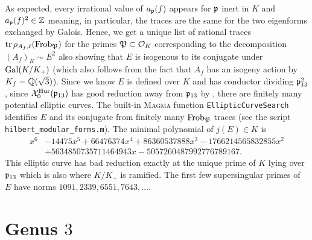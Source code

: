 \documentclass[main.tex]{subfiles}
\begin{document}
As expected, every irrational value of $a_{\mathfrak{p}}(f)$ appears for $\mathfrak{p}$ inert in $K$ and $a_{\mathfrak{p}}(f)^2 \in \mathbb{Z}$ meaning, in particular, the traces are the same for the two eigenforms exchanged by Galois. Hence, we get a unique list of rational traces $\operatorname{\mathrm{tr}}{\rho_{A_f, \ell}(\operatorname{\mathrm{Frob}}_{\mathfrak{P}})}$ for the primes $\mathfrak{P} \subset \mathcal{O}_K$ corresponding to the decomposition $(A_f)_K \sim E^2$ also showing that $E$ is isogenous to its conjugate under $\operatorname{\mathrm{Gal}}(K / K_+)$ (which also follows from the fact that $A_f$ has an isogeny action by $K_f = \mathbb{Q}(\sqrt{3})$). Since we know $E$ is defined over $K$ and has conductor dividing $\mathfrak{p}_{13}^2$, since $\mathcal{X}_0^{\mathrm{Hur}}(\mathfrak{p}_{13})$ has good reduction away from $\mathfrak{p}_{13}$ by \cite{carayol:representations,kisin:integral_models}, there are finitely many potential elliptic curves. The built-in \textsc{Magma} function \texttt{EllipticCurveSearch} identifies $E$ and its conjugate from finitely many $\operatorname{\mathrm{Frob}}_{\mathfrak{P}}$ traces (see the script \texttt{hilbert\_modular\_forms.m}). The minimal polynomial of $j(E) \in K$ is
\begin{align*}
    x^6 & - 14475 x^5 + 66476374 x^4 + 86360537888 x^3  - 1766214565832855 x^2
    \\
    & + 5634850735711464943 x - 5057260487992776789167.
\end{align*}
This elliptic curve has bad reduction exactly at the unique prime of $K$ lying over $\mathfrak{p}_{13}$ which is also where $K / K_+$ is ramified. The first few supersingular primes of $E$ have norms $1091, 2339, 6551, 7643, \dots$.

\section{Genus $3$} \label{sec:genus3} \label{section:models}
\end{document}
